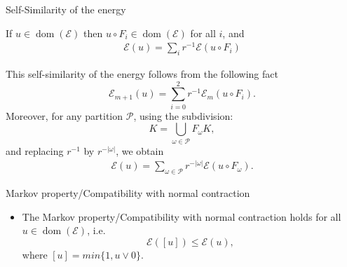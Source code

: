 \begin{frame}{Self-Similarity of the energy}
\begin{theorem}
If $u \in \operatorname{dom}(\mathcal{E})$ then $u \circ F_i \in \operatorname{dom}(\mathcal{E})$ for all $i$, and
\begin{align}\label{self-sim energy}
    \mathcal{E}(u)=\sum_i r^{-1} \mathcal{E}\left(u \circ F_i\right)
\end{align}
\end{theorem}
This self-similarity of the energy follows from the following fact
$$
\mathcal{E}_{m+1}(u)=\sum_{i=0}^{2} r^{-1} \mathcal{E}_m\left(u \circ F_i\right).
$$
Moreover, for any partition $\mathcal{P}$, using the subdivision:
\begin{equation}
    K=\underset{\omega \in \mathcal{P}}{\bigcup}F_{\omega}K,
\end{equation}
and replacing $r^{-1}$ by $r^{-|\omega|}$, we obtain
\begin{align}\label{self-sim energy}
    \mathcal{E}(u)=\sum_{\omega\in \mathcal{P}} r^{-|\omega|} \mathcal{E}\left(u \circ F_{\omega}\right).
\end{align}
\end{frame}

\begin{frame}{Markov property/Compatibility with normal contraction}
    \begin{itemize}
    \item The {Markov property/Compatibility with normal contraction} holds for all $u\in \operatorname{dom}(\mathcal{E})$, i.e.
    $$
    \mathcal{E}([u])\leq \mathcal{E}(u), 
    $$
    where $[u]=min\{1, u\vee 0\}$.
    \end{itemize}
\end{frame}
